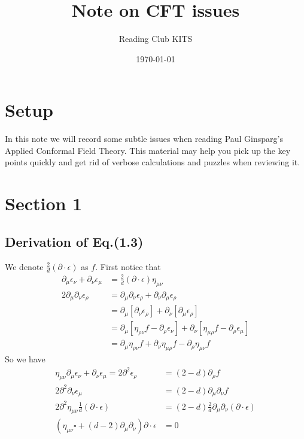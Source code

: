 \documentclass[letterpaper,12pt]{article}
\theoremstyle{definition}
\theoremstyle{remark}
\newcommand{\pmu}{\partial_{\mu}}
\newcommand{\pnu}{\partial_{\nu}}
\newcommand{\pro}{\partial_{\rho}}
\begin{document}
\title{Note on CFT issues}
\author{Reading Club KITS}
\date{\today}
\maketitle

\onehalfspacing
\section{Setup}
In this note we will record some subtle issues when reading Paul Ginsparg's Applied Conformal Field Theory. This material may help you pick up the key points quickly and get rid of verbose calculations and puzzles when reviewing it.

\section{Section 1}
\subsection{Derivation of Eq.(1.3)}
We denote $\frac{2}{d}(\partial\cdot\epsilon)$ as $f$.
First notice that
\begin{align}
\partial_{\mu}\epsilon_{\nu}+\partial_{\nu}\epsilon_{\mu}&=\frac{2}{d}(\partial\cdot \epsilon)\eta_{\mu\nu}\\    2\pmu\pnu\epsilon_{\rho}&=\pmu\pnu\epsilon_\rho+\pnu\pmu\epsilon_{\rho}\\
    &=\pmu\left[\pnu\epsilon_{\rho} \right]+\pnu\left[\pmu\epsilon_{\rho} \right]\\
    &=\pmu[\eta_{\rho\nu}f-\pro\epsilon_\nu]+\pnu[\eta_{\mu\rho}f-\pro\epsilon_{\mu}]\\
    &=\pmu\eta_{\rho\nu}f+\pnu\eta_{\mu\rho}f-\pro\eta_{\mu\nu}f
\end{align}
So we have
\begin{align}
\eta_{\mu\nu}\partial_{\mu}\epsilon_{\nu}+\partial_{\nu}\epsilon_{\mu}=2\partial^2\epsilon_{\rho}&=(2-d)\pro f\\
2\partial^{2}\pnu \epsilon_{\mu}&=(2-d)\pmu\pnu f\\
2\partial^2\eta_{\mu\nu}\frac{1}{d}(\partial\cdot\epsilon)&=(2-d)\frac{2}{d}\pmu\pnu (\partial\cdot\epsilon)\\
(\eta_{\mu\nu} \square +(d-2)\pmu\pnu)\partial\cdot\epsilon&=0
\end{align}
\end{document}
